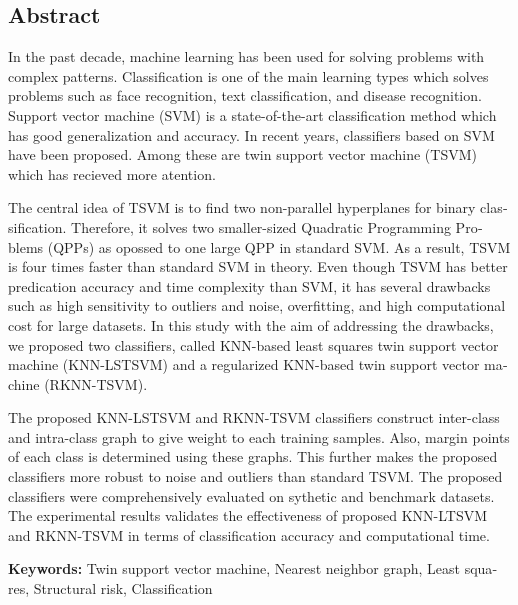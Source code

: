 

\begin{latin}
	
	\section*{Abstract}
	\noindent In the past decade, machine learning has been used for solving problems with complex patterns. Classification is one of the main learning types which solves problems such as face recognition, text classification, and disease recognition. Support vector machine (SVM) is a state-of-the-art classification method which has good generalization and accuracy. In recent years, classifiers based on SVM have been proposed. Among these are twin support vector machine (TSVM) which has recieved more atention.
	
	The central idea of TSVM is to find two non-parallel hyperplanes for binary classification. Therefore, it solves two smaller-sized Quadratic Programming Problems (QPPs) as opossed to one large QPP in standard SVM. As a result, TSVM is four times faster than standard SVM in theory. Even though TSVM has better predication accuracy and time complexity than SVM, it has several drawbacks such as high sensitivity to outliers and noise, overfitting, and high computational cost for large datasets. In this study with the aim of addressing the drawbacks, we proposed two classifiers, called KNN-based least squares twin support vector machine (KNN-LSTSVM) and a regularized KNN-based twin support vector machine (RKNN-TSVM).
	
	The proposed KNN-LSTSVM and RKNN-TSVM classifiers construct inter-class and intra-class graph to give weight to each training samples. Also, margin points of each class is determined using these graphs. This further makes the proposed classifiers more robust to noise and outliers than standard TSVM. The proposed classifiers were comprehensively evaluated on sythetic and benchmark datasets. The experimental results validates the effectiveness of proposed KNN-LTSVM and RKNN-TSVM in terms of classification accuracy and computational time.
	
	
	\vspace{2cm}
	\noindent \textbf{Keywords:}
	Twin support vector machine, Nearest neighbor graph, Least squares, Structural risk, Classification 
	
\end{latin}